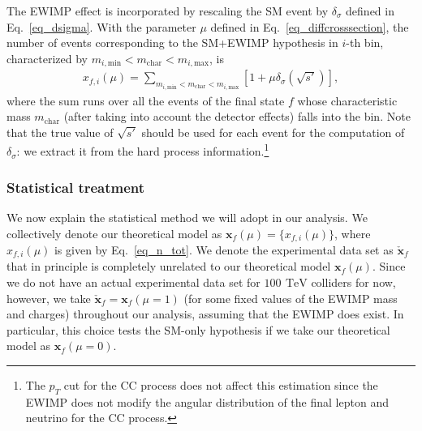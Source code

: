 \documentclass[12pt,twoside,book]{article}
\begin{document}
The EWIMP effect is incorporated by rescaling the
SM event by $\delta_\sigma$ defined in Eq.~\eqref{eq_dsigma}.  With the
parameter $\mu$ defined in Eq.~\eqref{eq_diffcrosssection}, the number
of events corresponding to the SM+EWIMP hypothesis in $i$-th bin,
characterized by $m_{i, \mathrm{min}} < m_{\mathrm{char}} < m_{i, \mathrm{max}}$, is
\begin{align}
  x_{f,i} (\mu) = \sum_{m_{i, \mathrm{min}} < m_{\mathrm{char}} < m_{i, \mathrm{max}}}
  \left[
    1 + \mu \delta_\sigma (\sqrt{s'})
  \right],
  \label{eq_n_tot}
\end{align}
where the sum runs over all the events of the final state $f$ whose characteristic mass
$m_{\mathrm{char}}$ (after taking into account the detector effects)
falls into the bin.  Note that the true value of $\sqrt{s'}$ should be used for
each event for the computation of $\delta_\sigma$:
we extract it from the hard process information.\footnote{
	The $p_T$ cut for the CC process does not affect this estimation
	since the EWIMP does not modify the angular distribution of the
	final lepton and neutrino for the CC process.
}


\subsubsection{Statistical treatment}
\label{sec_statistical}

We now explain the statistical method we will adopt in our analysis.
We collectively denote our theoretical model as $\bm{x}_f(\mu) = \{
x_{f,i} (\mu) \}$, where $x_{f,i}(\mu)$ is given by
Eq.~\eqref{eq_n_tot}.  We denote the experimental data set as
$\check{\bm{x}}_f$ that in principle is completely unrelated to our
theoretical model $\bm{x}_f(\mu)$.  Since we do not have an actual
experimental data set for $100~\,\mathrm{TeV}$ colliders for now,
however, we take $\check{\bm{x}}_f = \bm{x}_f(\mu = 1)$ (for some
fixed values of the EWIMP mass and charges) throughout our analysis,
assuming that the EWIMP does exist.  In particular, this choice tests
the SM-only hypothesis if we take our theoretical model as
$\bm{x}_f(\mu=0)$.
\end{document}
